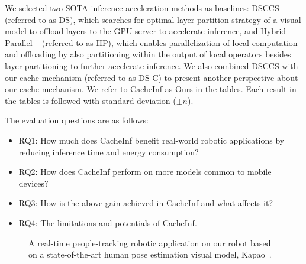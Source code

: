 We selected two SOTA inference acceleration methods as baselines: DSCCS~\cite{liang2023dnn} (referred to as DS), which searches for optimal layer partition strategy of a visual model to offload layers to the GPU server to accelerate inference, and Hybrid-Parallel ~\cite{sun2024hybridparallel} (referred to as HP), which enables parallelization of local computation and offloading by also partitioning within the output of local operators besides layer partitioning to further accelerate inference. 
We also combined DSCCS with our cache mechanism (referred to as DS-C) to present another perspective about our cache mechanism.
We refer to CacheInf as Ours in the tables.
Each result in the tables is followed with standard deviation ($\pm n$).

The evaluation questions are as follows:
\begin{itemize}
    \item RQ1: How much does CacheInf benefit real-world robotic applications by reducing inference time and energy consumption?
    \item RQ2: How does CacheInf perform on more models common to mobile devices?
    \item RQ3: How is the above gain achieved in CacheInf and what affects it?
    \item RQ4: The limitations and potentials of CacheInf.
\end{itemize}

\begin{figure}[!t]
    \centering

    \caption{A real-time people-tracking robotic application on our robot based on a state-of-the-art human pose estimation visual model, Kapao~\cite{kapao}.}
    \label{fig:kapao}
\end{figure}

